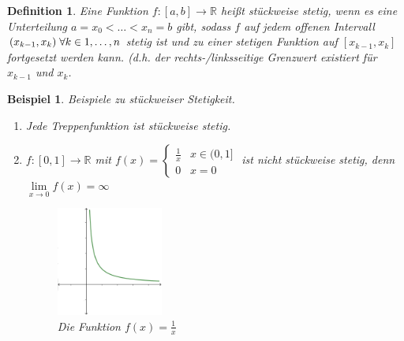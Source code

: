 \documentclass[a4paper,titlepage,oneside]{article}
\def\R{\ensuremath{\mathbb{R}} }
\def\fa{\ensuremath{\forall}}
\def\sp{\hspace{0,1cm}}
\newcommand{\limnull}[2][n]{\ensuremath{\lim\limits_{#1 \rightarrow 0}{#2}}}
\theoremstyle{thmstyle}
\newtheorem{defi}[satz]{Definition}
\newtheorem{bsp}[satz]{Beispiel}
\theoremstyle{subthmstyle}
\begin{document}
\begin{defi}
Eine Funktion $f: [a,b] \to \R$ heißt stückweise stetig, wenn es eine Unterteilung $a = x_0 < \dots < x_n = b$ gibt, sodass $f$ auf jedem offenen Intervall $(x_{k-1}, x_k)  \sp \fa k \in {1, \dots, n} $ stetig ist und zu einer stetigen Funktion auf $[x_{k-1}, x_k]$ fortgesetzt werden kann. (d.h. der rechts-/linksseitige Grenzwert existiert für $x_{k-1}$ und $x_k$.
\end{defi}

\begin{bsp}
Beispiele zu stückweiser Stetigkeit.
\begin{enumerate}
\item Jede Treppenfunktion ist stückweise stetig.
\item $f:[0,1] \to \R$ mit $f(x) = \begin{cases} \frac{1}{x} & x \in(0,1]\\ 0 & x = 0\end{cases}$ ist nicht stückweise stetig, denn $\limnull[x]{f(x)} = \infty$
\begin{figure}[ht]\centering
 \includegraphics[width=0.33\textwidth]{images/funktion_1durchx.png}
\caption{Die Funktion $f(x) = \frac{1}{x}$}
\end{figure}
\end{enumerate}
\end{bsp}
\end{document}
